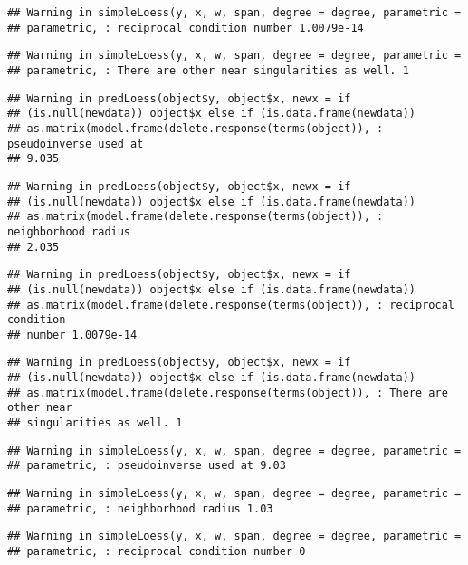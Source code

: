 \documentclass[
]{article}
\begin{document}
\begin{verbatim}
## Warning in simpleLoess(y, x, w, span, degree = degree, parametric =
## parametric, : reciprocal condition number 1.0079e-14
\end{verbatim}

\begin{verbatim}
## Warning in simpleLoess(y, x, w, span, degree = degree, parametric =
## parametric, : There are other near singularities as well. 1
\end{verbatim}

\begin{verbatim}
## Warning in predLoess(object$y, object$x, newx = if
## (is.null(newdata)) object$x else if (is.data.frame(newdata))
## as.matrix(model.frame(delete.response(terms(object)), : pseudoinverse used at
## 9.035
\end{verbatim}

\begin{verbatim}
## Warning in predLoess(object$y, object$x, newx = if
## (is.null(newdata)) object$x else if (is.data.frame(newdata))
## as.matrix(model.frame(delete.response(terms(object)), : neighborhood radius
## 2.035
\end{verbatim}

\begin{verbatim}
## Warning in predLoess(object$y, object$x, newx = if
## (is.null(newdata)) object$x else if (is.data.frame(newdata))
## as.matrix(model.frame(delete.response(terms(object)), : reciprocal condition
## number 1.0079e-14
\end{verbatim}

\begin{verbatim}
## Warning in predLoess(object$y, object$x, newx = if
## (is.null(newdata)) object$x else if (is.data.frame(newdata))
## as.matrix(model.frame(delete.response(terms(object)), : There are other near
## singularities as well. 1
\end{verbatim}

\begin{verbatim}
## Warning in simpleLoess(y, x, w, span, degree = degree, parametric =
## parametric, : pseudoinverse used at 9.03
\end{verbatim}

\begin{verbatim}
## Warning in simpleLoess(y, x, w, span, degree = degree, parametric =
## parametric, : neighborhood radius 1.03
\end{verbatim}

\begin{verbatim}
## Warning in simpleLoess(y, x, w, span, degree = degree, parametric =
## parametric, : reciprocal condition number 0
\end{verbatim}
\end{document}
